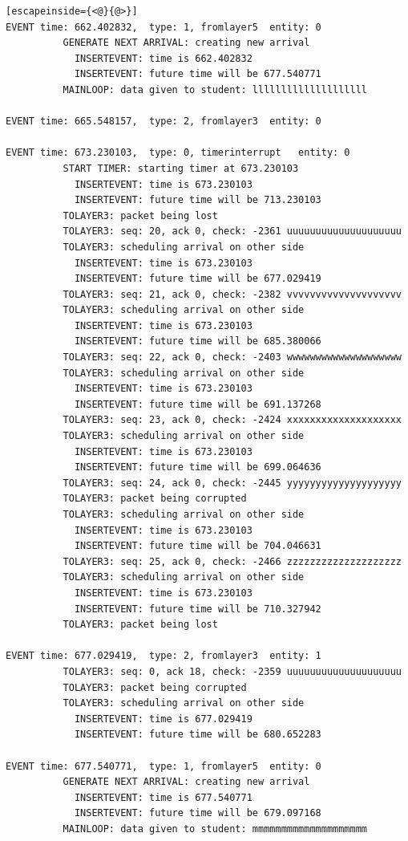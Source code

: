 \documentclass[paper=a4, fontsize=11pt]{scrartcl}
\numberwithin{equation}{section}		%
\numberwithin{figure}{section}			%
\numberwithin{table}{section}				%
\begin{document}
\begin{lstlisting}[escapeinside={<@}{@>}]
EVENT time: 662.402832,  type: 1, fromlayer5  entity: 0
          GENERATE NEXT ARRIVAL: creating new arrival
            INSERTEVENT: time is 662.402832
            INSERTEVENT: future time will be 677.540771
          MAINLOOP: data given to student: llllllllllllllllllll

EVENT time: 665.548157,  type: 2, fromlayer3  entity: 0

EVENT time: 673.230103,  type: 0, timerinterrupt   entity: 0
          START TIMER: starting timer at 673.230103
            INSERTEVENT: time is 673.230103
            INSERTEVENT: future time will be 713.230103
          TOLAYER3: packet being lost
          TOLAYER3: seq: 20, ack 0, check: -2361 uuuuuuuuuuuuuuuuuuuu
          TOLAYER3: scheduling arrival on other side
            INSERTEVENT: time is 673.230103
            INSERTEVENT: future time will be 677.029419
          TOLAYER3: seq: 21, ack 0, check: -2382 vvvvvvvvvvvvvvvvvvvv
          TOLAYER3: scheduling arrival on other side
            INSERTEVENT: time is 673.230103
            INSERTEVENT: future time will be 685.380066
          TOLAYER3: seq: 22, ack 0, check: -2403 wwwwwwwwwwwwwwwwwwww
          TOLAYER3: scheduling arrival on other side
            INSERTEVENT: time is 673.230103
            INSERTEVENT: future time will be 691.137268
          TOLAYER3: seq: 23, ack 0, check: -2424 xxxxxxxxxxxxxxxxxxxx
          TOLAYER3: scheduling arrival on other side
            INSERTEVENT: time is 673.230103
            INSERTEVENT: future time will be 699.064636
          TOLAYER3: seq: 24, ack 0, check: -2445 yyyyyyyyyyyyyyyyyyyy
          TOLAYER3: packet being corrupted
          TOLAYER3: scheduling arrival on other side
            INSERTEVENT: time is 673.230103
            INSERTEVENT: future time will be 704.046631
          TOLAYER3: seq: 25, ack 0, check: -2466 zzzzzzzzzzzzzzzzzzzz
          TOLAYER3: scheduling arrival on other side
            INSERTEVENT: time is 673.230103
            INSERTEVENT: future time will be 710.327942
          TOLAYER3: packet being lost

EVENT time: 677.029419,  type: 2, fromlayer3  entity: 1
          TOLAYER3: seq: 0, ack 18, check: -2359 uuuuuuuuuuuuuuuuuuuu
          TOLAYER3: packet being corrupted
          TOLAYER3: scheduling arrival on other side
            INSERTEVENT: time is 677.029419
            INSERTEVENT: future time will be 680.652283

EVENT time: 677.540771,  type: 1, fromlayer5  entity: 0
          GENERATE NEXT ARRIVAL: creating new arrival
            INSERTEVENT: time is 677.540771
            INSERTEVENT: future time will be 679.097168
          MAINLOOP: data given to student: mmmmmmmmmmmmmmmmmmmm


\end{lstlisting}
\end{document}
